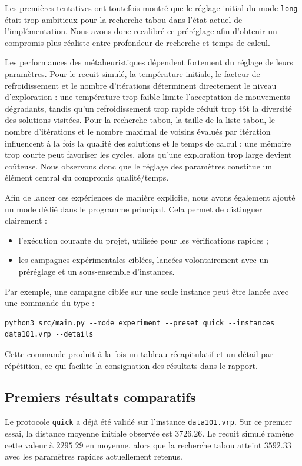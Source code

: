 \documentclass[11pt,a4paper]{article}
\begin{document}
Les premières tentatives ont toutefois montré que le réglage initial du mode \texttt{long} était trop ambitieux pour la recherche tabou dans l'état actuel de l'implémentation. Nous avons donc recalibré ce préréglage afin d'obtenir un compromis plus réaliste entre profondeur de recherche et temps de calcul.

Les performances des métaheuristiques dépendent fortement du réglage de leurs paramètres. Pour le recuit simulé, la température initiale, le facteur de refroidissement et le nombre d'itérations déterminent directement le niveau d'exploration : une température trop faible limite l'acceptation de mouvements dégradants, tandis qu'un refroidissement trop rapide réduit trop tôt la diversité des solutions visitées. Pour la recherche tabou, la taille de la liste tabou, le nombre d'itérations et le nombre maximal de voisins évalués par itération influencent à la fois la qualité des solutions et le temps de calcul : une mémoire trop courte peut favoriser les cycles, alors qu'une exploration trop large devient coûteuse. Nous observons donc que le réglage des paramètres constitue un élément central du compromis qualité/temps.

Afin de lancer ces expériences de manière explicite, nous avons également ajouté un mode dédié dans le programme principal. Cela permet de distinguer clairement :
\begin{itemize}
    \item l'exécution courante du projet, utilisée pour les vérifications rapides ;
    \item les campagnes expérimentales ciblées, lancées volontairement avec un préréglage et un sous-ensemble d'instances.
\end{itemize}

Par exemple, une campagne ciblée sur une seule instance peut être lancée avec une commande du type :
\begin{lstlisting}
python3 src/main.py --mode experiment --preset quick --instances data101.vrp --details
\end{lstlisting}

Cette commande produit à la fois un tableau récapitulatif et un détail par répétition, ce qui facilite la consignation des résultats dans le rapport.

\subsection{Premiers résultats comparatifs}
Le protocole \texttt{quick} a déjà été validé sur l'instance \texttt{data101.vrp}. Sur ce premier essai, la distance moyenne initiale observée est \(3726.26\). Le recuit simulé ramène cette valeur à \(2295.29\) en moyenne, alors que la recherche tabou atteint \(3592.33\) avec les paramètres rapides actuellement retenus.
\end{document}
